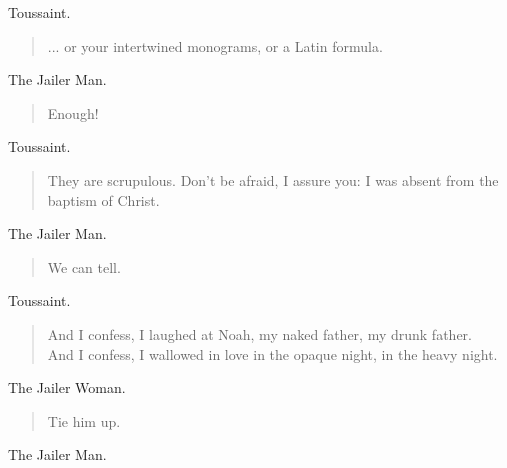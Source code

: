 \documentclass[letterpaper,article,12pt,oneside,notitlepage]{memoir}
\begin{document}
\begin{center}Toussaint.\end{center}

\begin{verse}
... or your intertwined monograms, or a Latin formula. \\
\end{verse}

\begin{center}The Jailer Man.\end{center}

\begin{verse}
Enough! \\
\end{verse}

\begin{center}Toussaint.\end{center}

\begin{verse}
They are scrupulous. Don't be afraid, I assure you: I was absent from the baptism of Christ.  \\
\end{verse}

\begin{center}The Jailer Man.\end{center}

\begin{verse}
We can tell. \\
\end{verse}

\begin{center}Toussaint.\end{center}

\begin{verse}
And I confess, I laughed at Noah, my naked father, my drunk father. \\
And I confess, I wallowed in love in the opaque night, in the heavy night. \\
\end{verse}

\begin{center}The Jailer Woman.\end{center}

\begin{verse}
Tie him up. \\
\end{verse}

\begin{center}The Jailer Man.\end{center}
\end{document}
